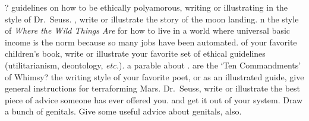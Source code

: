 \bverse ?
\newpage
\bversenonum {} guidelines on how to be ethically polyamorous, writing or illustrating in the style of Dr.~Seuss.
\newpage%
\bversenonum {}, write or illustrate the story of the moon landing.
\newpage%
\bversenonum {} {n the style of} \textit{Where the Wild Things Are} for how to live in a world where universal basic income is the norm because so many jobs have been automated.
\newpage%
\bversenonum {} of your favorite children's book, write or illustrate your favorite set of ethical guidelines (utilitarianism, deontology, \textit{etc.}).
\newpage%
\bversenonum {} a parable about \color{red}{u}\color{orange}{n}\color{yellow}{i}\color{green}{c}\color{teal}{o}\color{blue}{r}\color{violet}{n}\color{purple}{s}\color{black}.
\newpage%
\bversenonum {} are the `Ten Commandments' of Whimsy?
\newpage%
\bversenonum {} the writing style of your favorite poet, or as an illustrated guide, give general instructions for terraforming Mars.
\newpage%
\bversenonum {} Dr.~Seuss, write or illustrate the best piece of advice someone has ever offered you.
\newpage%
\bversenonum {} and get it out of your system. Draw a bunch of genitals. Give some useful advice about genitals, also.
\newpage


